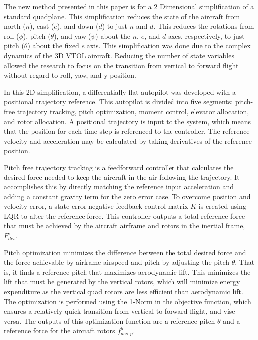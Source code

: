 The new method presented in this paper is for a 2 Dimensional simplification of a standard quadplane. 
This simplification reduces the state of the aircraft from north ($n$), east ($e$), and down ($d$) to just $n$ and $d$. 
This reduces the rotations from roll ($\phi$), pitch ($\theta$), and yaw ($\psi$) about the $n$, $e$, and $d$ axes, respectively, to just pitch ($\theta$) about the fixed $e$ axis. 
This simplification was done due to the complex dynamics of the 3D VTOL aircraft. 
Reducing the number of state variables allowed the research to focus on the transition from vertical to forward flight without regard to roll, yaw, and y position. 

In this 2D simplification, a differentially flat autopilot was developed with a positional trajectory reference.
This autopilot is divided into five segments: pitch-free trajectory tracking, pitch optimization, moment control, elevator allocation, and rotor allocation.
A positional trajectory is input to the system, which means that the position for each time step is referenced to the controller.
The reference velocity and acceleration may be calculated by taking derivatives of the reference position.

Pitch free trajectory tracking is a feedforward controller that calculates the desired force needed to keep the aircraft in the air following the trajectory.
It accomplishes this by directly matching the reference input acceleration and adding a constant gravity term for the zero error case.
To overcome position and velocity error, a state error negative feedback control matrix $K$ is created using LQR to alter the reference force.
This controller outputs a total reference force that must be achieved by the aircraft airframe and rotors in the inertial frame, $F_{des}^i$. 

Pitch optimization minimizes the difference between the total desired force and the force achievable by airframe airspeed and pitch by adjusting the pitch $\theta$.
That is, it finds a reference pitch that maximizes aerodynamic lift.
This minimizes the lift that must be generated by the vertical rotors, which will minimize energy expenditure as the vertical quad rotors are less efficient than aerodynamic lift.
The optimization is performed using the 1-Norm in the objective function, which ensures a relatively quick transition from vertical to forward flight, and vise versa.
The outputs of this optimization function are a reference pitch $\theta$ and a reference force for the aircraft rotors $f^b_{des,p}$.

